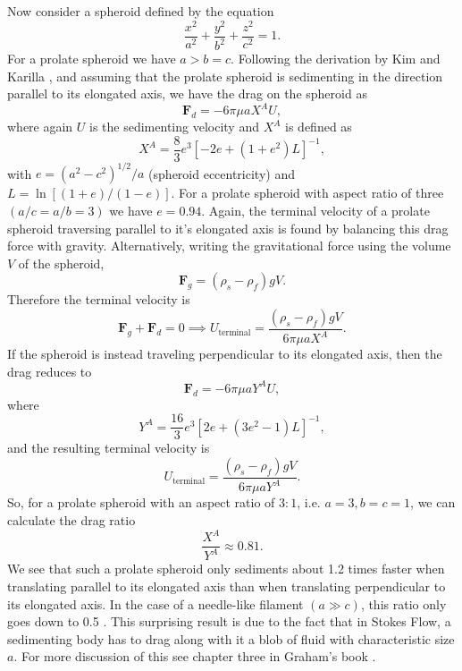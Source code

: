\documentclass{article}
\def\F{\mathbf{F}}
\begin{document}
Now consider a spheroid defined by the equation
\begin{equation}
    \frac{x^2}{a^2} + \frac{y^2}{b^2} + \frac{z^2}{c^2} = 1.
\end{equation}
For a prolate spheroid we have $a > b = c$. Following the derivation by Kim and Karilla \cite{k&k}, and 
assuming that the prolate spheroid is sedimenting in the direction parallel to its elongated axis, we have the drag
on the spheroid as 
\begin{equation}
    \F_d = -6\pi\mu a X^A U,
\end{equation}
where again $U$ is the sedimenting velocity and $X^A$ is defined as 
\begin{equation}
    X^A = \frac{8}{3}e^3\left[-2e + (1+e^2)L\right]^{-1},
\end{equation}
with $e = (a^2 - c^2)^{1/2}/a$ (spheroid eccentricity) and $L = \ln\left[(1+e)/(1-e)\right]$. For a prolate spheroid
with aspect ratio of three $(a/c = a/b = 3)$ we have $e = 0.94$. Again, the terminal velocity of a prolate spheroid 
traversing parallel to it's elongated axis is found by balancing this drag force with gravity. Alternatively, writing the
gravitational force using the volume $V$ of the spheroid, 
\begin{equation}
    \F_g = (\rho_s - \rho_f)gV.
\end{equation}
Therefore the terminal velocity is 
\begin{equation}
    \F_g + \F_d = 0 \implies U_{\text{terminal}} = \frac{(\rho_s - \rho_f)gV}{6\pi\mu a X^A}.
\end{equation}
If the spheroid is instead traveling perpendicular to its elongated axis, then the drag reduces 
to 
\begin{equation}
    \F_d = -6\pi\mu a Y^A U,
\end{equation}
where 
\begin{equation}
    Y^A = \frac{16}{3}e^3\left[2e + (3e^2-1)L\right]^{-1},
\end{equation}
and the resulting terminal velocity is 
\begin{equation}
    U_{\text{terminal}} =  \frac{(\rho_s - \rho_f)gV}{6\pi\mu a Y^A}.
\end{equation}
So, for a prolate spheroid with an aspect ratio of $3:1$, i.e. $a = 3, b  = c = 1$, we can calculate the drag ratio
\begin{equation}
    \frac{X^A}{Y^A} \approx 0.81.
\end{equation}
We see that such a prolate spheroid only sediments about 1.2 times 
faster when translating parallel to its elongated axis than when translating perpendicular to its 
elongated axis. In the case of a needle-like filament $(a \gg c)$, this ratio only goes down to 0.5 \cite{Graham}.
This surprising result is due to the fact that in Stokes Flow, a sedimenting body has to drag along with it a blob of fluid with characteristic size $a$. For more discussion 
of this see chapter three in Graham's book \cite{Graham}.
\end{document}
